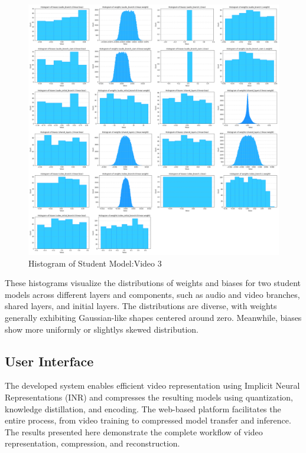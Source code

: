     \begin{figure}[H]
        \centering
        \includegraphics[width=\linewidth]{assets/quantization/histogram/histogram_rick_student.png}
        \caption{Histogram of Student Model:Video 3}
        \label{fig:hist-student-vid3}
    \end{figure}

    These histograms visualize the distributions of weights and biases for two student models across different layers and components, such as audio and video branches, shared layers, and initial layers. The distributions are diverse, with weights generally exhibiting Gaussian-like shapes centered around zero. Meanwhile, biases show more uniformly or slightlys skewed distribution.
    \pagebreak


\subsection{User Interface}

    The developed system enables efficient video representation using Implicit Neural Representations (INR) and compresses the resulting models using quantization, knowledge distillation, and encoding. The web-based platform facilitates the entire process, from video training to compressed model transfer and inference. The results presented here demonstrate the complete workflow of video representation, compression, and reconstruction.
    
